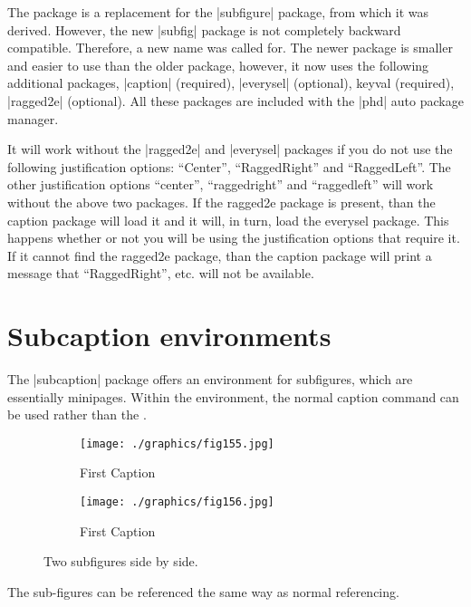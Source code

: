 The package is a replacement for the |subfigure| package, from which it was derived.
However, the new |subfig| package is not completely backward compatible.
Therefore, a new name was called for. The newer package is smaller and easier to use
than the older package, however, it now uses the following additional packages,  |caption| (required),  |everysel| (optional),
keyval (required),  |ragged2e| (optional). All these packages are included with the |phd| auto package manager.

It will work without the |ragged2e| and |everysel| packages if you do not use the following
justification options: \enquote{Center}, \enquote{RaggedRight} and \enquote{RaggedLeft}. The other justification
options \enquote{center}, \enquote{raggedright} and \enquote{raggedleft} will work without the above two packages. If the ragged2e package is present, than the caption package will load it and it
will, in turn, load the everysel package. This happens whether or not you will be using
the justification options that require it. If it cannot find the ragged2e package, than the
caption package will print a message that \enquote{RaggedRight}, etc. will not be available.

\section{Subcaption environments}

The |subcaption| package offers an environment for subfigures, which are essentially minipages. Within the environment, the normal caption command can be used rather than the \cmd{\subcaption}.

\begin{figure}%
    \centering
    \captionsetup[figure]{margin=3pt}%
    \begin{subfigure}[b]{.35\linewidth}
    \texttt{[image: ./graphics/fig155.jpg]} 
    \label{fig:one}
    \caption{First Caption}
    \end{subfigure}\hspace{2em}
    \begin{subfigure}[b]{.35\linewidth}
    \texttt{[image: ./graphics/fig156.jpg]} 
    \caption{First Caption}
    \end{subfigure}
    \caption{Two subfigures side by side.}
    \label{fig:two}
\end{figure}

The sub-figures can be referenced the same way as normal referencing.

